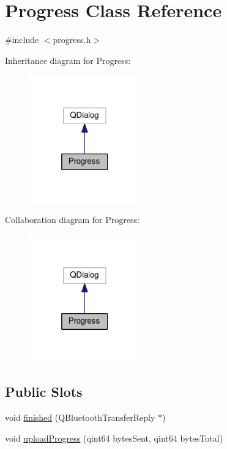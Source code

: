 \hypertarget{classProgress}{}\section{Progress Class Reference}
\label{classProgress}


{\ttfamily \#include $<$progress.\+h$>$}



Inheritance diagram for Progress\+:
\nopagebreak
\begin{figure}[H]
\begin{center}
\leavevmode
\includegraphics[width=136pt]{classProgress__inherit__graph}
\end{center}
\end{figure}


Collaboration diagram for Progress\+:
\nopagebreak
\begin{figure}[H]
\begin{center}
\leavevmode
\includegraphics[width=136pt]{classProgress__coll__graph}
\end{center}
\end{figure}
\subsection*{Public Slots}
\begin{DoxyCompactItemize}
\item 
void \hyperlink{classProgress_a15a8bf25ca7faafcc866813f1fd90677}{finished} (Q\+Bluetooth\+Transfer\+Reply $\ast$)
\item 
void \hyperlink{classProgress_ae4b8bbb82b1713a353688fb24ea39864}{upload\+Progress} (qint64 bytes\+Sent, qint64 bytes\+Total)
\end{DoxyCompactItemize}

